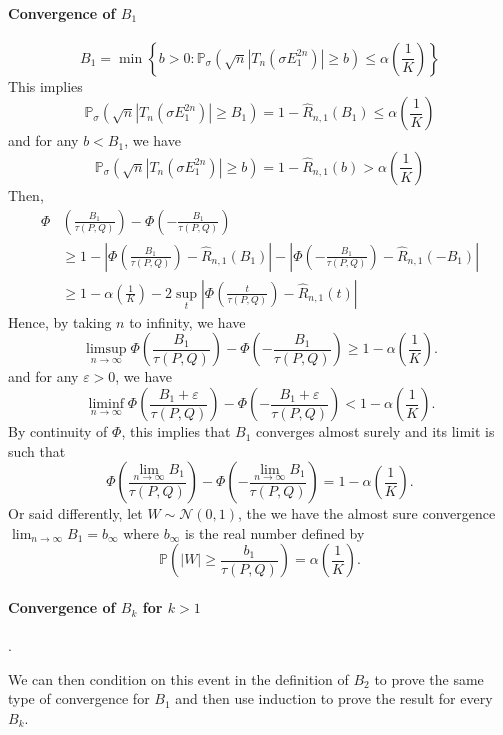 \documentclass{article}
\theoremstyle{plain}
\theoremstyle{remark}
\renewcommand{\P}{\mathbb{P}}
\newcommand{\1}{\mathbbm{1}}
\numberwithin{equation}{section}
\begin{document}
\paragraph{Convergence of $B_1$}
$$B_1 = \min \left\{ b>0 : \P_\sigma(\sqrt{n}|T_n(\sigma E_1^{2n})|\ge b) \le \alpha\left(\frac{1}{K}\right)\right\} $$
This implies
$$\P_\sigma(\sqrt{n}|T_n(\sigma E_1^{2n})|\ge B_1) = 1-\widehat{R}_{n,1}\left(B_1\right) \le \alpha\left( \frac{1}{K} \right) $$
and for any $b < B_1$, we have
$$\P_\sigma(\sqrt{n}|T_n(\sigma E_1^{2n})|\ge b)=1-\widehat{R}_{n,1}\left(b\right) > \alpha\left( \frac{1}{K} \right) $$
Then,
\begin{align*}
\Phi&\left( \frac{B_1}{\tau(P,Q)}\right)-\Phi\left(-\frac{B_1}{\tau(P,Q)}\right)\\
 &\ge 1-\left|\Phi\left( \frac{B_1}{\tau(P,Q)}\right) -\widehat{R}_{n,1}\left(B_1\right) \right|-\left|\Phi\left( -\frac{B_1}{\tau(P,Q)}\right) -\widehat{R}_{n,1}\left(-B_1\right) \right| \\
&\ge1- \alpha\left( \frac{1}{K} \right)- 2\sup_{t}\left|\Phi\left( \frac{t}{\tau(P,Q)}\right) -\widehat{R}_{n,1}\left(t\right) \right|
\end{align*}
Hence, by taking $n$ to infinity, we have
$$\limsup_{n \to \infty} \Phi\left( \frac{B_1}{\tau(P,Q)}\right)-\Phi\left(-\frac{B_1}{\tau(P,Q)}\right) \ge 1-\alpha\left( \frac{1}{K} \right).$$
and for any $\varepsilon>0$, we have
$$\liminf_{n \to \infty} \Phi\left( \frac{B_1+\varepsilon}{\tau(P,Q)}\right)-\Phi\left( -\frac{B_1+\varepsilon}{\tau(P,Q)}\right) < 1- \alpha\left( \frac{1}{K} \right).$$
By continuity of $\Phi$, this implies that $B_1$ converges almost surely and its limit is such that
$$\Phi\left( \frac{\lim_{n \to \infty}B_1}{\tau(P,Q)}\right)-\Phi\left( -\frac{\lim_{n \to \infty}B_1}{\tau(P,Q)}\right)= 1-\alpha\left( \frac{1}{K} \right).$$
Or said differently, let $W\sim \mathcal{N}(0,1)$, the we have the almost sure convergence $\lim_{n \to \infty}B_1 = b_\infty$ where $b_\infty$ is the real number defined by
$$ \P\left(\left|W \right|\ge \frac{b_1}{\tau(P,Q)}  \right)=\alpha\left( \frac{1}{K} \right).$$

\paragraph{Convergence of $B_k$ for $k>1$}.

We can then condition on this event in the definition of $B_2$ to prove the same type of convergence for $B_1$ and then use induction to prove the result for every $B_k$.
\newpage
\end{document}
